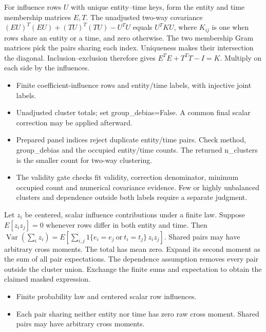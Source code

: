 \expandafter\def\csname statadic@statement@STATADIC-PANELCOV-001\endcsname{For influence rows $U$ with unique entity--time keys,
  form the entity and time membership matrices $E,T$. The unadjusted
  two-way covariance $(EU)^T(EU)+(TU)^T(TU)-U^TU$ equals $U^TKU$,
  where $K_{ij}$ is one when rows share an entity or a time, and zero otherwise.}
\expandafter\def\csname statadic@proof@STATADIC-PANELCOV-001\endcsname{The two membership Gram matrices pick the pairs sharing each
  index. Uniqueness makes their intersection the diagonal. Inclusion--exclusion
  therefore gives $E^TE+T^TT-I=K$. Multiply on each side by the influences.}
\expandafter\def\csname statadic@assumptions@STATADIC-PANELCOV-001\endcsname{\begin{itemize}
\item Finite coefficient-influence rows and entity/time labels, with injective joint labels.
\item Unadjusted cluster totals; set group\_debias=False. A common final scalar correction may be applied afterward.
\end{itemize}}
\expandafter\def\csname statadic@diagnostics@STATADIC-PANELCOV-001\endcsname{\begin{itemize}
\item Prepared panel indices reject duplicate entity/time pairs. Check method, group\_debias and the occupied entity/time counts. The returned n\_clusters is the smaller count for two-way clustering.
\item The validity gate checks fit validity, correction denominator, minimum occupied count and numerical covariance evidence. Few or highly unbalanced clusters and dependence outside both labels require a separate judgment.
\end{itemize}}
\expandafter\def\csname statadic@statement@STATADIC-PANELCOV-002\endcsname{Let $z_i$ be centered, scalar influence contributions under
  a finite law. Suppose $E[z_i z_j]=0$ whenever rows differ in both entity and
  time. Then $\operatorname{Var}(\sum_i z_i)=
  E[\sum_{i,j}1\{e_i=e_j\ \mathrm{or}\ t_i=t_j\}\,z_i z_j]$. Shared pairs
  may have arbitrary cross moments.}
\expandafter\def\csname statadic@proof@STATADIC-PANELCOV-002\endcsname{The total has mean zero. Expand its second moment as the
  sum of all pair expectations. The dependence assumption removes every
  pair outside the cluster union. Exchange the finite sums and expectation
  to obtain the claimed masked expression.}
\expandafter\def\csname statadic@assumptions@STATADIC-PANELCOV-002\endcsname{\begin{itemize}
\item Finite probability law and centered scalar row influences.
\item Each pair sharing neither entity nor time has zero raw cross moment. Shared pairs may have arbitrary cross moments.
\end{itemize}}
